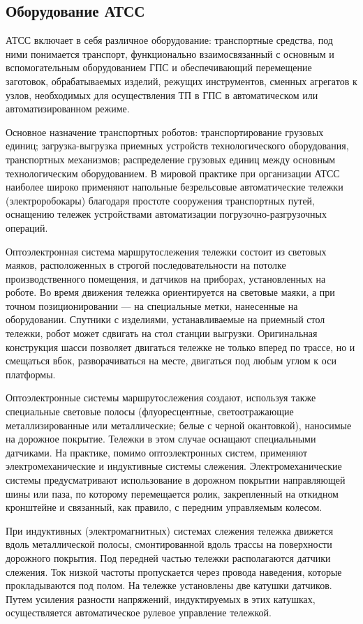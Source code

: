 \subsection{Оборудование АТСС}

АТСС включает в себя различное оборудование: транспортные средства, под ними понимается транспорт, функционально взаимосвязанный с основным и вспомогательным оборудованием ГПС и обеспечивающий перемещение заготовок, обрабатываемых изделий, режущих инструментов, сменных агрегатов к узлов, необходимых для осуществления ТП в ГПС в автоматическом или автоматизированном режиме.

Основное назначение транспортных роботов: транспортирование грузовых единиц; загрузка-выгрузка приемных устройств технологического оборудования, транспортных механизмов; распределение грузовых единиц между основным технологическим оборудованием. В мировой практике при организации АТСС наиболее широко применяют напольные безрельсовые автоматические тележки (электроробокары) благодаря простоте сооружения транспортных путей, оснащению тележек устройствами автоматизации погрузочно-разгрузочных операций. 

Оптоэлектронная система маршрутослежения тележки состоит из световых маяков, расположенных в строгой последовательности на потолке производственного помещения, и датчиков на приборах, установленных на роботе. Во время движения тележка ориентируется на световые маяки, а при точном позиционировании --- на специальные метки, нанесенные на оборудовании. Спутники с изделиями, устанавливаемые на приемный стол тележки, робот может сдвигать на стол станции выгрузки. Оригинальная конструкция шасси позволяет двигаться тележке не только вперед по трассе, но и смещаться вбок, разворачиваться на месте, двигаться под любым углом к оси платформы.

Оптоэлектронные системы маршрутослежения создают, используя также специальные световые полосы (флуоресцентные, светоотражающие металлизированные или металлические; белые с черной окантовкой), наносимые на дорожное покрытие. Тележки в этом случае оснащают специальными датчиками. На практике, помимо оптоэлектронных систем, применяют электромеханические и индуктивные системы слежения. Электромеханические системы предусматривают использование в дорожном покрытии направляющей шины или паза, по которому перемещается ролик, закрепленный на откидном кронштейне и связанный, как правило, с передним управляемым колесом.

При индуктивных (электромагнитных) системах слежения тележка движется вдоль металлической полосы, смонтированной вдоль трассы на поверхности дорожного покрытия. Под передней частью тележки располагаются датчики слежения. Ток низкой частоты пропускается через провода наведения, которые прокладываются под полом. На тележке установлены две катушки датчиков. Путем усиления разности напряжений, индуктируемых в этих катушках, осуществляется автоматическое рулевое управление тележкой.

